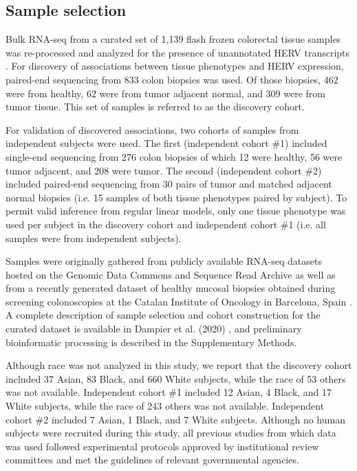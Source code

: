 \subsection*{Sample selection}
Bulk RNA-seq from a curated set of 1,139 flash frozen colorectal tissue samples was re-processed and analyzed for the presence of unannotated HERV transcripts \citep{Dampier2020}.
For discovery of associations between tissue phenotypes and HERV expression, paired-end sequencing from 833 colon biopsies was used.
Of those biopsies, 462 were from healthy, 62 were from tumor adjacent normal, and 309 were from tumor tissue.
This set of samples is referred to as the discovery cohort.

For validation of discovered associations, two cohorts of samples from independent subjects were used.
The first (independent cohort \#1) included single-end sequencing from 276 colon biopsies of which 12 were healthy, 56 were tumor adjacent, and 208 were tumor.
The second (independent cohort \#2) included paired-end sequencing from 30 pairs of tumor and matched adjacent normal biopsies (i.e. 15 samples of both tissue phenotypes paired by subject).
To permit valid inference from regular linear models, only one tissue phenotype was used per subject in the discovery cohort and independent cohort \#1 (i.e. all samples were from independent subjects).

Samples were originally gathered from publicly available RNA-seq datasets hosted on the Genomic Data Commons and Sequence Read Archive as well as from a recently generated dataset of healthy mucosal biopsies obtained during screening colonoscopies at the Catalan Institute of Oncology in Barcelona, Spain \citep{Dampier2020, DiezObrero2020}.
A complete description of sample selection and cohort construction for the curated dataset is available in Dampier et al. (2020) \citep{Dampier2020}, and preliminary bioinformatic processing is described in the Supplementary Methods.

Although race was not analyzed in this study, we report that the discovery cohort included 37 Asian, 83 Black, and 660 White subjects, while the race of 53 others was not available.
Independent cohort \#1 included 12 Asian, 4 Black, and 17 White subjects, while the race of 243 others was not available.
Independent cohort \#2 included 7 Asian, 1 Black, and 7 White subjects.
Although no human subjects were recruited during this study, all previous studies from which data was used followed experimental protocols approved by institutional review committees and met the guidelines of relevant governmental agencies.

